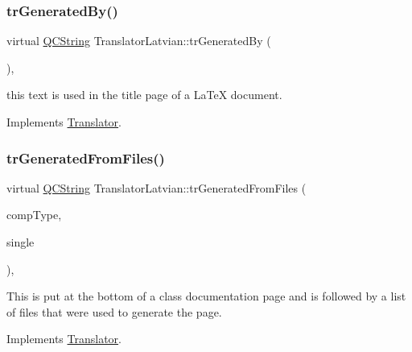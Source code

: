\mbox{\label{class_translator_latvian_a1de8a2c8f8df5d4227864cb0953b8a72}} 
\subsubsection{\texorpdfstring{trGeneratedBy()}{trGeneratedBy()}}
{\footnotesize\ttfamily virtual \mbox{\hyperlink{class_q_c_string}{Q\+C\+String}} Translator\+Latvian\+::tr\+Generated\+By (\begin{DoxyParamCaption}{ }\end{DoxyParamCaption})\hspace{0.3cm}{\ttfamily [inline]}, {\ttfamily [virtual]}}

this text is used in the title page of a La\+TeX document. 

Implements \mbox{\hyperlink{class_translator}{Translator}}.

\mbox{\label{class_translator_latvian_a248b23dcbcb24ba075b68ef9559e6476}} 
\subsubsection{\texorpdfstring{trGeneratedFromFiles()}{trGeneratedFromFiles()}}
{\footnotesize\ttfamily virtual \mbox{\hyperlink{class_q_c_string}{Q\+C\+String}} Translator\+Latvian\+::tr\+Generated\+From\+Files (\begin{DoxyParamCaption}\item[{\mbox{\hyperlink{class_class_def_ae70cf86d35fe954a94c566fbcfc87939}{Class\+Def\+::\+Compound\+Type}}}]{comp\+Type,  }\item[{bool}]{single }\end{DoxyParamCaption})\hspace{0.3cm}{\ttfamily [inline]}, {\ttfamily [virtual]}}

This is put at the bottom of a class documentation page and is followed by a list of files that were used to generate the page. 

Implements \mbox{\hyperlink{class_translator}{Translator}}.

\mbox{\label{class_translator_latvian_ae8609f4dbd33e7c73f80e43feeec83a6}} 
